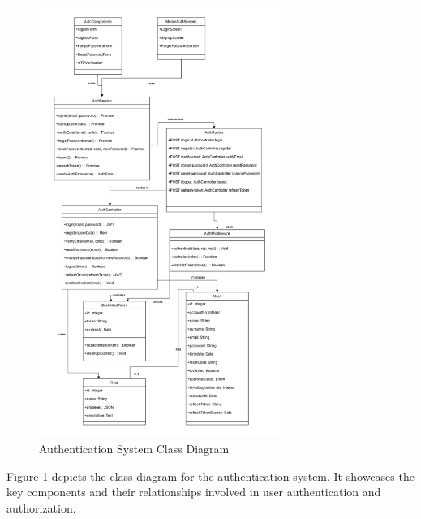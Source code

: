 \begin{figure}[htbp]
    \centering
    \includegraphics[width=0.7\textwidth]{images/auth_classdiag.PNG}
    \caption{Authentication System Class Diagram}
    \label{fig:auth-class-diagram}
\end{figure}

Figure \ref{fig:auth-class-diagram} depicts the class diagram for the authentication system. It showcases the key components and their relationships involved in user authentication and authorization.

\newpage

